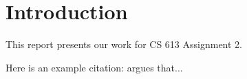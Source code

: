 \section{Introduction}

This report presents our work for CS 613 Assignment 2.

Here is an example citation: \citet{Gusfield:97} argues that...
